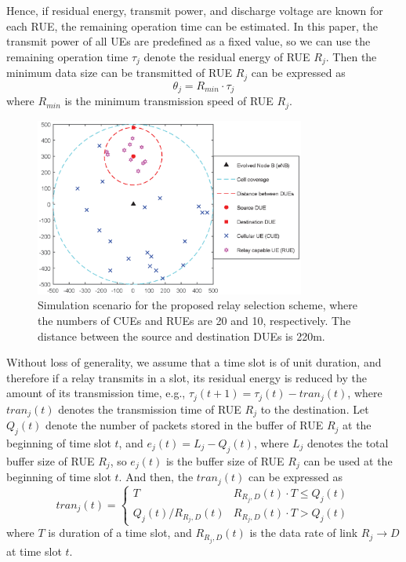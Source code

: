 \documentclass[conference]{IEEEtran}
\begin{document}
Hence, if residual energy, transmit power, and discharge voltage are known for each RUE, the remaining operation time can be estimated. In this paper, the transmit power of all UEs are predefined as a fixed value, so we can use the remaining operation time $\tau_j$ denote the residual energy of RUE $R_j$. Then the minimum data size can be transmitted of RUE $R_j$ can be expressed as
\begin{equation}
\theta_j = R_{min} \cdot \tau_j
\end{equation}
where $R_{min}$ is the minimum transmission speed of RUE $R_j$.
\begin{figure}[!t]
\center
\includegraphics[width=3.5in]{fig2}
\caption{Simulation scenario for the proposed relay selection scheme, where the numbers of CUEs and RUEs are 20 and 10, respectively. The distance between the source and destination DUEs is 220m.}
\label{fig_scenario}
\end{figure}
Without loss of generality, we assume that a time slot is of unit duration, and therefore if a relay transmits in a slot, its residual energy is reduced by the amount of its transmission time, e.g., $\tau_j(t+1) = \tau_j(t) - tran_j(t)$, where $tran_j(t)$ denotes the transmission time of RUE $R_j$ to the destination. Let $Q_j(t)$ denote the number of packets stored in the buffer of RUE $R_j$ at the beginning of time slot $t$, and $e_j(t) = L_j -  Q_j(t)$, where $L_j$ denotes the total buffer size of RUE $R_j$, so $e_j(t)$ is the buffer size of RUE $R_j$ can be used at the beginning of time slot $t$. And then, the $tran_j(t)$ can be expressed as
\begin{equation}
tran_j(t) = \begin{cases}T & R_{R_j,D}(t)\cdot T \leq Q_j(t)\\Q_j(t)/R_{R_j,D}(t) & R_{R_j,D}(t)\cdot T > Q_j(t)\end{cases}
\end{equation}
where $T$ is duration of a time slot, and $R_{R_j,D}(t)$ is the data rate of link $R_j \rightarrow D$ at time slot $t$.
\end{document}

